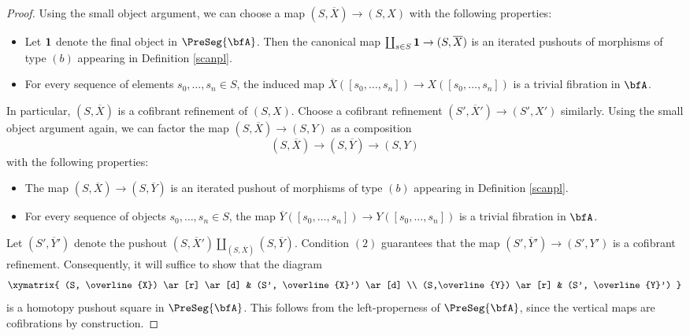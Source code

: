 \begin{proof}
Using the small object argument, we can choose a map
$(S, \overline{X}) \rightarrow (S,X)$ with the following properties:
\begin{itemize}
\item[$(a)$] Let ${\bf 1}$ denote the final object in $\PreSeg{\bfA}$. Then
the canonical map $\coprod_{s \in S} {\bf 1} \rightarrow (S, \overline{X})$ is an
iterated pushouts of morphisms of type $(b)$ appearing in Definition \ref{scanpl}. 
\item[$(b)$] For every sequence of elements $s_0, \ldots, s_n \in S$, the induced map
$\overline{X}( [s_0, \ldots, s_n] ) \rightarrow X( [s_0, \ldots, s_n] )$ is a trivial fibration in $\bfA$.
\end{itemize}
In particular, $(S, \overline{X})$ is a cofibrant refinement of $(S, X)$. Choose a cofibrant
refinement $(S', \overline{X}') \rightarrow (S', X')$ similarly. Using the small object
argument again, we can factor the map $(S, \overline{X}) \rightarrow (S, Y)$ as a composition
$$ (S, \overline{X}) \rightarrow (S, \overline{Y}) \rightarrow (S, Y)$$
with the following properties:
\begin{itemize}
\item[$(c)$] The map $(S, \overline{X}) \rightarrow (S, \overline{Y})$ is an iterated
pushout of morphisms of type $(b)$ appearing in Definition \ref{scanpl}.
\item[$(d)$] For every sequence of objects $s_0, \ldots, s_n \in S$, the map
$\overline{Y}( [s_0, \ldots, s_n] ) \rightarrow Y( [s_0, \ldots, s_n] )$ is a trivial fibration in $\bfA$.
\end{itemize}
Let $(S', \overline{Y}')$ denote the pushout $(S, \overline{X}') \coprod_{ (S, \overline{X} )} (S, \overline{Y})$. Condition $(2)$ guarantees that the map $(S', \overline{Y}') \rightarrow (S', Y')$ is a cofibrant refinement. Consequently, it will suffice to show that the diagram
$$ \xymatrix{ (S, \overline{X}) \ar[r] \ar[d] & (S', \overline{X}') \ar[d] \\
(S,\overline{Y}) \ar[r] & (S', \overline{Y}') }$$
is a homotopy pushout square in $\PreSeg{\bfA}$. This follows from the left-properness of
$\PreSeg{\bfA}$, since the vertical maps are cofibrations by construction.
\end{proof}


